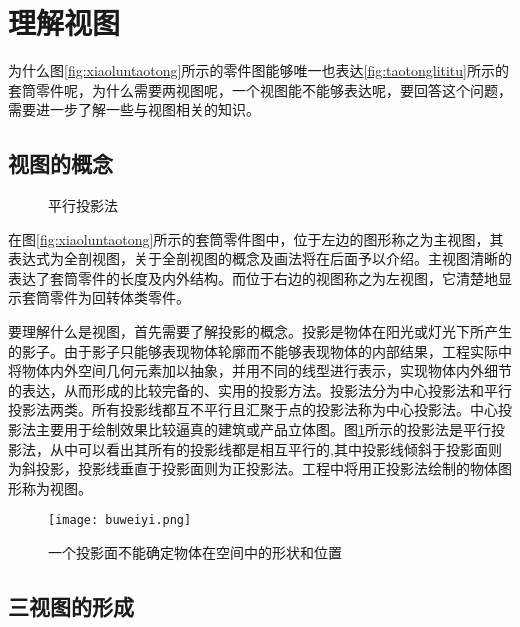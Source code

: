 \section{理解视图}\label{sec:lijieshitu}
为什么图\ref{fig:xiaoluntaotong}所示的零件图能够唯一也表达\ref{fig:taotonglititu}所示的套筒零件呢，为什么需要两视图呢，一个视图能不能够表达呢，要回答这个问题，需要进一步了解一些与视图相关的知识。
\subsection{视图的概念}
\begin{figure}[htbp]
\centering
{}\hspace{30pt}
\caption{平行投影法}\label{pingxingtouyin}
\end{figure}

 在图\ref{fig:xiaoluntaotong}所示的套筒零件图中，位于左边的图形称之为主视图，其表达式为全剖视图，关于全剖视图的概念及画法将在后面予以介绍。主视图清晰的表达了套筒零件的长度及内外结构。而位于右边的视图称之为左视图，它清楚地显示套筒零件为回转体类零件。

要理解什么是视图，首先需要了解投影的概念。投影是物体在阳光或灯光下所产生的影子。由于影子只能够表现物体轮廓而不能够表现物体的内部结果，工程实际中将物体内外空间几何元素加以抽象，并用不同的线型进行表示，实现物体内外细节的表达，从而形成的比较完备的、实用的投影方法。投影法分为中心投影法和平行投影法两类。所有投影线都互不平行且汇聚于点的投影法称为中心投影法。中心投影法主要用于绘制效果比较逼真的建筑或产品立体图。图\ref{pingxingtouyin}所示的投影法是平行投影法，从中可以看出其所有的投影线都是相互平行的,其中投影线倾斜于投影面则为斜投影，投影线垂直于投影面则为正投影法。工程中将用正投影法绘制的物体图形称为视图。
\begin{figure}[htbp]
\centering
\texttt{[image: buweiyi.png]}
\caption{一个投影面不能确定物体在空间中的形状和位置}\label{fig:singleprojection}
\end{figure}
\subsection{三视图的形成}

